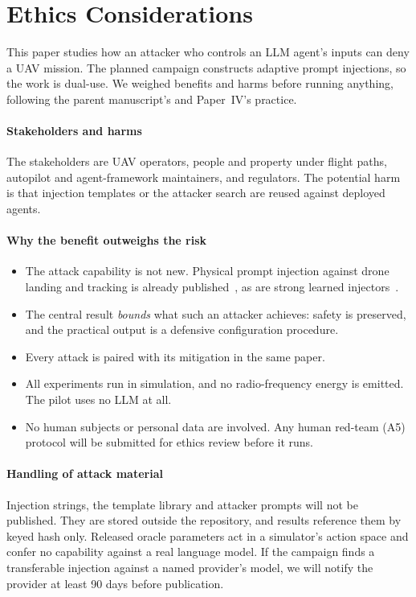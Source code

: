 \section{Ethics Considerations}\label{sec:ethics}
This paper studies how an attacker who controls an LLM agent's inputs can
deny a UAV mission. The planned campaign constructs adaptive prompt
injections, so the work is dual-use. We weighed benefits and harms before
running anything, following the parent manuscript's and Paper~IV's practice.

\paragraph{Stakeholders and harms} The stakeholders are UAV operators,
people and property under flight paths, autopilot and agent-framework
maintainers, and regulators. The potential harm is that injection templates
or the attacker search are reused against deployed agents.

\paragraph{Why the benefit outweighs the risk}
\begin{itemize}
\item The attack capability is not new. Physical prompt injection against
  drone landing and tracking is already
  published~\cite{burbano2025chai}, as are strong learned
  injectors~\cite{wen2025rlhammer}.
\item The central result \emph{bounds} what such an attacker achieves:
  safety is preserved, and the practical output is a defensive
  configuration procedure.
\item Every attack is paired with its mitigation in the same paper.
\item All experiments run in simulation, and no radio-frequency energy is
  emitted. The pilot uses no LLM at all.
\item No human subjects or personal data are involved. Any human red-team
  (A5) protocol will be submitted for ethics review before it runs.
\end{itemize}

\paragraph{Handling of attack material} Injection strings, the template
library and attacker prompts will not be published. They are stored outside
the repository, and results reference them by keyed hash only. Released
oracle parameters act in a simulator's action space and confer no capability
against a real language model. If the campaign finds a transferable
injection against a named provider's model, we will notify the provider at
least 90 days before publication.

